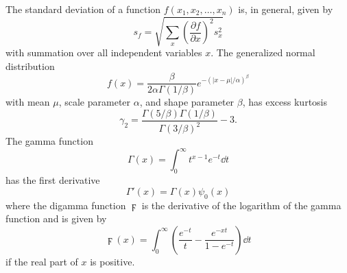 The standard deviation of a function $f(x_{1},x_{2},\dots,x_{n})$ is, in general, given by
\begin{equation} \label{eq:analysis--general_stdev}
	s_{f} = \sqrt{\sum_{x} \left( \frac{\partial f}{\partial x} \right)^{2} s_{x}^{2}}
\end{equation}
with summation over all independent variables $x$.  The generalized normal distribution
\begin{equation} \label{eq:analysis--generalized_normal_reprint}
	f(x) = \frac{\beta}{2 \alpha \Gamma(1/\beta)} e^{-(|x - \mu| / \alpha)^{\beta}}
\end{equation}
with mean $\mu$, scale parameter $\alpha$, and shape parameter $\beta$, has excess kurtosis
\begin{equation} \label{eq:analysis--kurtosis_reprint}
	\gamma_{2} = \frac{\Gamma(5/\beta) \Gamma(1/\beta)}{\Gamma(3/\beta)^{2}} - 3.
\end{equation}
The gamma function
\begin{equation} \label{eq:analysis--gamma_function_reprint}
	\Gamma(x) = \int_{0}^{\infty} t^{x-1} e^{-t} \dd t
\end{equation}
has the first derivative
\begin{equation} \label{eq:analysis--gamma_prime}
	\Gamma'(x) = \Gamma(x) \psi_{0}(x)
\end{equation}
where the digamma function $\digamma$ is the derivative of the logarithm of the gamma function and is given by
\begin{equation} \label{eq:analysis--digamma}
	\digamma(x) = \int_{0}^{\infty} \left( \frac{e^{-t}}{t} - \frac{e^{-xt}}{1 - e^{-t}} \right) \dd t
\end{equation}
if the real part of $x$ is positive.

